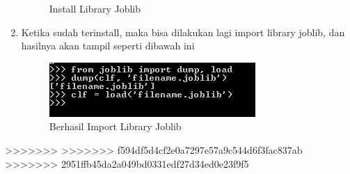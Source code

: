\begin{enumerate}
\begin{figure}
\begin{center}
\caption{Install Library Joblib}
\end{center}
\end{figure}
\item
Ketika sudah terinstall, maka bisa dilakukan lagi import library joblib, dan hasilnya akan tampil seperti dibawah ini
\begin{figure}
\begin{center}
\includegraphics[scale=1]{figures/hasil3.png}
\caption{Berhasil Import Library Joblib}
\end{center}
\end{figure}
\end{enumerate}




>>>>>>> 
>>>>>>> f594df5d4cf2e0a7297e57a9c544d6f3fac837ab
>>>>>>> 2951ffb45da2a049bd0331edf27d34ed0e23f9f5
